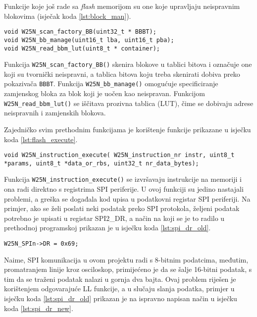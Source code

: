 Funkcije koje još rade sa \textit{flash} memorijom su one koje upravljaju neispravnim blokovima (isječak koda \ref{lst:block_man}).

\begin{lstlisting}[caption=Funkcije za upravljanje neispravnim blokovima, label={lst:block_man}]
void W25N_scan_factory_BB(uint32_t * BBBT);
void W25N_bb_manage(uint16_t lba, uint16_t pba);
void W25N_read_bbm_lut(uint8_t * container);
\end{lstlisting}

\noindent Funkcija \verb|W25N_scan_factory_BB()| skenira blokove u tablici bitova i označuje one koji su tvornički neispravni, a tablica bitova koju treba skenirati dobiva preko pokazivača \verb|BBBT|. Funkcija \verb|W25N_bb_manage()| omogućuje specificiranje zamjenskog bloka za blok koji je uočen kao neispravan. Funkcijom \verb|W25N_read_bbm_lut()| se iščitava prozivna tablica (LUT), čime se dobivaju adrese neispravnih i zamjenskih blokova.

Zajedničko svim prethodnim funkcijama je korištenje funkcije prikazane u isječku koda \ref{lst:flash_execute}.

\begin{lstlisting}[caption=Funkcija za izvođenje instrukcije na \textit{flash} memoriji, label={lst:flash_execute}]
void W25N_instruction_execute( W25N_instruction_nr instr, uint8_t *params, uint8_t *data_or_rbs, uint32_t nr_data_bytes);
\end{lstlisting}

\noindent Funkcija \verb|W25N_instruction_execute()| se izvršavaju instrukcije na  memoriji i ona radi direktno s registrima SPI periferije. U ovoj funkciji su jedino nastajali problemi, a greška se događala kod upisa u podatkovni registar SPI periferiji. Na primjer, ako se želi poslati neki podatak preko SPI protokola, željeni podatak potrebno je upisati u registar SPI2\_DR, a način na koji se je to radilo u prethodnoj programskoj prikazan je u isječku koda \ref{lst:spi_dr_old}.

\begin{lstlisting}[caption=Upis podatka u SPI2\_DR registar, label={lst:spi_dr_old}]
W25N_SPIn->DR = 0x69;
\end{lstlisting}

\noindent Naime, SPI komunikacija u ovom projektu radi s 8-bitnim podatcima, međutim, promatranjem linije kroz osciloskop, primijećeno je da se šalje 16-bitni podatak, s tim da se traženi podatak nalazi u gornja dva bajta. Ovaj problem riješen je korištenjem odgovarajuće LL funkcije, a u slučaju slanja podatka, primjer u isječku koda \ref{lst:spi_dr_old} prikazan je na ispravno napisan način u isječku koda \ref{lst:spi_dr_new}.

